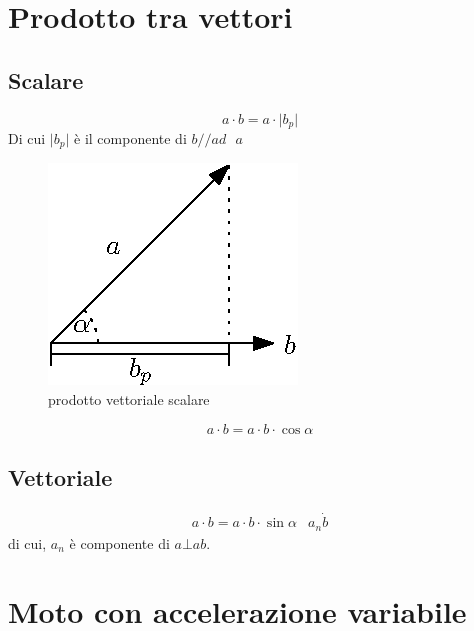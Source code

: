 \documentclass{book}
\newcommand{\abs}[1]{\lvert#1\rvert}
\begin{document}
\section{Prodotto tra vettori}
\label{sec:prodottotravect}

\subsection{Scalare}
\label{sec:scalare}

\begin{equation}
  \label{eq:scalare}
  a\cdot b=a\cdot\abs{b_p}
\end{equation}
Di cui $\abs{b_p}$ è il componente di $b//ad\text{ }a$
\begin{figure}[ht!]
  \centering
  \includegraphics{img/scalare.eps}
  \caption{prodotto vettoriale scalare}
  \label{fig:prodvectscal}
\end{figure}
\begin{equation}
  \label{eq:scalare2}
  a\cdot b= a\cdot b\cdot \cos \alpha
\end{equation}

\subsection{Vettoriale}
\label{sec:vectprod}
\begin{equation}
  \label{eq:prodvec}
  \begin{matrix}
    a\cdot b=a\cdot b\cdot \sin \alpha & a_n \dot b
  \end{matrix}
\end{equation}
di cui, $a_n$ è componente di $a \bot a b$.

\section{Moto con accelerazione variabile}
\label{sec:motoconaccevar}
\end{document}
